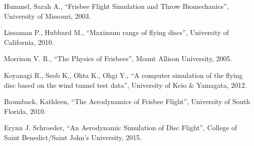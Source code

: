 \documentclass[10pt,a4paper]{report}
\begin{document}
\begin{thebibliography}{9}

  Hummel, Sarah A.,
  “Frisbee Flight Simulation and Throw Biomechanics”,
  University of Missouri,
  2003.
  
  Lissaman P., Hubbard M.,
  “Maximum range of flying discs”,
  University of California,
  2010.
  
  Morrison V. R.,
  “The Physics of Frisbees”,
  Mount Allison University,
  2005.

  Koyanagi R., Seob K., Ohta K., Ohgi Y.,
  “A computer simulation of the flying disc based on the wind tunnel test data”,
  University of Keio \& Yamagata,
  2012.
  
  Baumback, Kathleen,
  “The Aerodynamics of Frisbee Flight”,
  University of South Florida,
  2010.
  
  Erynn J. Schroeder,
  “An Aerodynamic Simulation of Disc Flight”,
  College of Saint Benedict/Saint John's University,
  2015.

\end{thebibliography}
\end{document}
